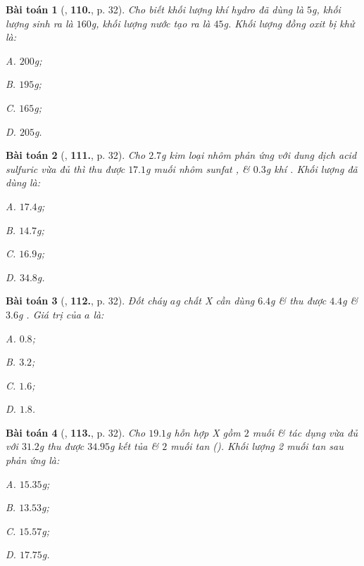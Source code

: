 \documentclass{article}
\numberwithin{equation}{section}
\newtheorem{baitoan}{Bài toán}
\begin{document}
\begin{baitoan}[\cite{An2011}, \textbf{110.}, p. 32]
	Cho biết khối lượng khí hydro đã dùng là $5$g, khối lượng  sinh ra là $160$g, khối lượng nước tạo ra là $45$g. Khối lượng đồng oxit bị khử là:
	\begin{enumerate*}
		\item[{\rm\sf A.}] $200$g;
		\item[{\rm\sf B.}] $195$g;
		\item[{\rm\sf C.}] $165$g;
		\item[{\rm\sf D.}] $205$g.
	\end{enumerate*}
\end{baitoan}

\begin{baitoan}[\cite{An2011}, \textbf{111.}, p. 32]
	Cho $2.7$g kim loại nhôm phản ứng với dung dịch acid sulfuric  vừa đủ thì thu được $17.1$g muối nhôm sunfat , \& $0.3$g khí . Khối lượng  đã dùng là:
	\begin{enumerate*}
		\item[{\rm\sf A.}] $17.4$g;
		\item[{\rm\sf B.}] $14.7$g;
		\item[{\rm\sf C.}] $16.9$g;
		\item[{\rm\sf D.}] $34.8$g.
	\end{enumerate*}
\end{baitoan}

\begin{baitoan}[\cite{An2011}, \textbf{112.}, p. 32]
	Đốt cháy $a$g chất X cần dùng $6.4$g  \& thu được $4.4$g  \& $3.6$g . Giá trị của $a$ là:
	\begin{enumerate*}
		\item[{\rm\sf A.}] $0.8$;
		\item[{\rm\sf B.}] $3.2$;
		\item[{\rm\sf C.}] $1.6$;
		\item[{\rm\sf D.}] $1.8$.
	\end{enumerate*}
\end{baitoan}

\begin{baitoan}[\cite{An2011}, \textbf{113.}, p. 32]
	Cho $19.1$g hỗn hợp X gồm $2$ muối  \&  tác dụng vừa đủ với $31.2$g  thu được $34.95$g kết tủa  \& $2$ muối tan (). Khối lượng 2 muối tan sau phản ứng là:
	\begin{enumerate*}
		\item[{\rm\sf A.}] $15.35$g;
		\item[{\rm\sf B.}] $13.53$g;
		\item[{\rm\sf C.}] $15.57$g;
		\item[{\rm\sf D.}] $17.75$g.
	\end{enumerate*}
\end{baitoan}
\end{document}
